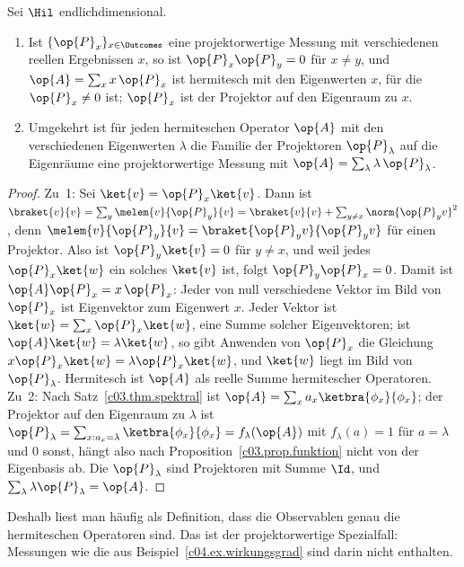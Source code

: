 \begin{proposition}\label{c04.prop.pvm}
  Sei $\Hil$ endlichdimensional.
  \begin{enumerate}
    \item Ist $\{\op{P}_x\}_{x \in \Outcomes}$ eine projektorwertige Messung mit verschiedenen reellen
      Ergebnissen $x$, so ist $\op{P}_x\op{P}_y = 0$ für $x \neq y$, und $\op{A} = \sum_x x\,\op{P}_x$
      ist hermitesch mit den Eigenwerten $x$, für die $\op{P}_x \neq 0$ ist; $\op{P}_x$ ist der
      Projektor auf den Eigenraum zu $x$.
    \item Umgekehrt ist für jeden hermiteschen Operator $\op{A}$ mit den verschiedenen Eigenwerten
      $\lambda$ die Familie der Projektoren $\op{P}_\lambda$ auf die Eigenräume eine projektorwertige
      Messung mit $\op{A} = \sum_\lambda \lambda\,\op{P}_\lambda$.
  \end{enumerate}
\end{proposition}
\begin{proof}
  Zu~1: Sei $\ket{v} = \op{P}_x\ket{v}$. Dann ist
  $\braket{v}{v} = \sum_y \melem{v}{\op{P}_y}{v} = \braket{v}{v} + \sum_{y \neq x} \norm{\op{P}_y v}^2$,
  denn $\melem{v}{\op{P}_y}{v} = \braket{\op{P}_y v}{\op{P}_y v}$ für einen Projektor. Also ist
  $\op{P}_y\ket{v} = 0$ für $y \neq x$, und weil jedes $\op{P}_x\ket{w}$ ein solches $\ket{v}$ ist,
  folgt $\op{P}_y\op{P}_x = 0$. Damit ist $\op{A}\op{P}_x = x\,\op{P}_x$: Jeder von null verschiedene
  Vektor im Bild von $\op{P}_x$ ist Eigenvektor zum Eigenwert $x$. Jeder Vektor ist
  $\ket{w} = \sum_x \op{P}_x\ket{w}$, eine Summe solcher Eigenvektoren; ist $\op{A}\ket{w} = \lambda\ket{w}$,
  so gibt Anwenden von $\op{P}_x$ die Gleichung $x\op{P}_x\ket{w} = \lambda\op{P}_x\ket{w}$, und
  $\ket{w}$ liegt im Bild von $\op{P}_\lambda$. Hermitesch ist $\op{A}$ als reelle Summe hermitescher
  Operatoren. Zu~2: Nach Satz~\ref{c03.thm.spektral} ist
  $\op{A} = \sum_x a_x\ketbra{\phi_x}{\phi_x}$; der Projektor auf den Eigenraum zu $\lambda$ ist
  $\op{P}_\lambda = \sum_{x: a_x = \lambda} \ketbra{\phi_x}{\phi_x} = f_\lambda(\op{A})$ mit
  $f_\lambda(a) = 1$ für $a = \lambda$ und $0$ sonst, hängt also nach
  Proposition~\ref{c03.prop.funktion} nicht von der Eigenbasis ab. Die $\op{P}_\lambda$ sind
  Projektoren mit Summe $\Id$, und $\sum_\lambda \lambda\op{P}_\lambda = \op{A}$.
\end{proof}

Deshalb liest man häufig als Definition, dass die Observablen genau die hermiteschen Operatoren
sind. Das ist der projektorwertige Spezialfall: Messungen wie die aus
Beispiel~\ref{c04.ex.wirkungsgrad} sind darin nicht enthalten.

